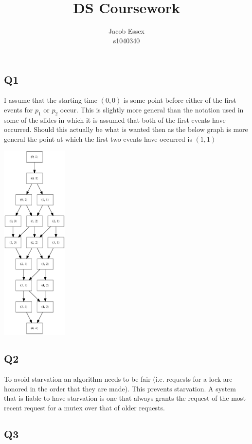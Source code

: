 \documentclass[11pt]{article}
\begin{document}
\title{DS Coursework}
\author{Jacob Essex \\ s1040340}
\date{}
\maketitle

\subsection*{Q1}

I assume that the starting time $(0,0)$ is some point before either of the first events for $p_1$ or $p_2$ occur. This is slightly more general than the notation used in some of the slides in which it is assumed that both of the first events have occurred. Should this actually be what is wanted then as the below graph is more general the point at which the first two events have occurred is $(1,1)$

\includegraphics[width=0.25\textwidth]{q1_theory.png}


\subsection*{Q2}
To avoid starvation an algorithm needs to be fair (i.e. requests for a lock are honored in the order that they are made). This prevents starvation. A system that is liable to have starvation is one that always grants the request of the most recent request for a mutex over that of older requests.

\subsection*{Q3}
\end{document}
